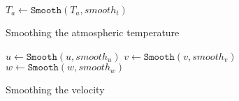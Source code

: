 \begin{algorithm}
    $T_a \leftarrow \texttt{Smooth}(T_a, smooth_t)$ \;
    \caption{Smoothing the atmospheric temperature}
    \label{alg:smootht}
\end{algorithm}

\begin{algorithm}
    $u \leftarrow \texttt{Smooth}(u, smooth_u)$ \;
    $v \leftarrow \texttt{Smooth}(v, smooth_v)$ \;
    $w \leftarrow \texttt{Smooth}(w, smooth_w)$ \;
    \caption{Smoothing the velocity}
    \label{alg:smoothv}
\end{algorithm}